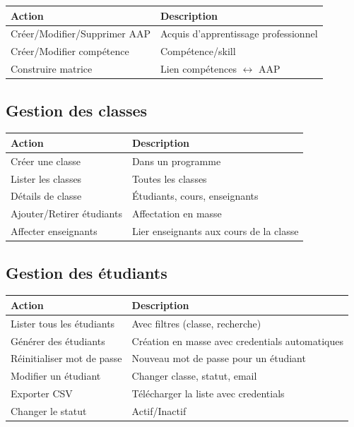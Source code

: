 \documentclass[12pt,a4paper]{article}
\begin{document}
\begin{longtable}{@{}p{4.5cm}p{10cm}@{}}
\toprule
\textbf{Action} & \textbf{Description} \\
\midrule
\endhead
Créer/Modifier/Supprimer AAP & Acquis d'apprentissage professionnel \\
Créer/Modifier compétence & Compétence/skill \\
Construire matrice & Lien compétences $\leftrightarrow$ AAP \\
\bottomrule
\end{longtable}

\subsection{Gestion des classes}

\begin{longtable}{@{}p{4.5cm}p{10cm}@{}}
\toprule
\textbf{Action} & \textbf{Description} \\
\midrule
\endhead
Créer une classe & Dans un programme \\
Lister les classes & Toutes les classes \\
Détails de classe & Étudiants, cours, enseignants \\
Ajouter/Retirer étudiants & Affectation en masse \\
Affecter enseignants & Lier enseignants aux cours de la classe \\
\bottomrule
\end{longtable}

\subsection{Gestion des étudiants}

\begin{longtable}{@{}p{5cm}p{9.5cm}@{}}
\toprule
\textbf{Action} & \textbf{Description} \\
\midrule
\endhead
Lister tous les étudiants & Avec filtres (classe, recherche) \\
Générer des étudiants & Création en masse avec credentials automatiques \\
Réinitialiser mot de passe & Nouveau mot de passe pour un étudiant \\
Modifier un étudiant & Changer classe, statut, email \\
Exporter CSV & Télécharger la liste avec credentials \\
Changer le statut & Actif/Inactif \\
\bottomrule
\end{longtable}
\end{document}

